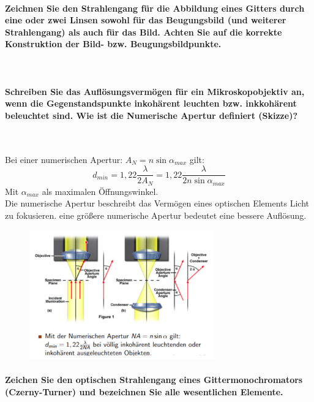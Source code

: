 \documentclass[a4paper, 11pt, ngerman, parskip=half-]{scrartcl}
\begin{document}
\paragraph{Zeichnen Sie den Strahlengang für die Abbildung eines Gitters durch eine oder zwei Linsen
sowohl für das Beugungsbild (und weiterer Strahlengang) als auch für das Bild. Achten Sie
auf die korrekte Konstruktion der Bild- bzw. Beugungsbildpunkte.} ~

\paragraph{Schreiben Sie das Auflösungsvermögen für ein Mikroskopobjektiv an, wenn die
Gegenstandspunkte inkohärent leuchten bzw. inkkohärent beleuchtet sind. Wie ist die Numerische
Apertur definiert (Skizze)?} ~

Bei einer numerischen Apertur: $A_N = n \sin \alpha_{max}$ gilt:
\begin{equation}
    d_{min} = 1,22 \frac{\lambda}{2 A_N} = 1,22 \frac{\lambda}{2 n \sin \alpha_{max}}
\end{equation}
Mit $\alpha_{max}$ als maximalen Öffnungswinkel.\\
Die numerische Apertur beschreibt das Vermögen eines optischen Elements Licht zu fokusieren. eine größere numerische Apertur 
bedeutet eine bessere Auflösung.
\begin{figure}[H]
    \centering
    \includegraphics[width=8cm]{image/22/opt25}
\end{figure}

\paragraph{Zeichen Sie den optischen Strahlengang eines Gittermonochromators (Czerny-Turner) und
bezeichnen Sie alle wesentlichen Elemente.} ~
\end{document}
